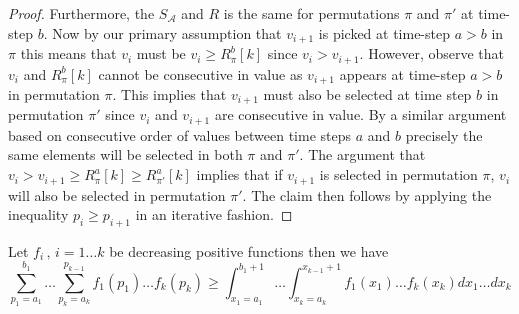 \begin{proof}
    
    Furthermore, the $S_{\mathcal{A}}$ and $R$ is the same for permutations $\pi$ and $\pi'$ at time-step $b$. Now by our primary assumption that $v_{i+1}$ is picked at time-step $a>b$ in $\pi$ this means that $v_i$ must be  $v_i \geq R^b_{\pi}[k]$ since $v_i > v_{i+1}$. However, observe that $v_i$ and $R^b_{\pi}[k]$ cannot be consecutive in value as $v_{i+1}$ appears at time-step $a > b$ in permutation $\pi$. This implies that $v_{i+1}$ must also be selected at time step $b$ in permutation $\pi'$ since $v_i$ and $v_{i+1}$ are consecutive in value. By a similar argument based on consecutive order of values between time steps $a$ and $b$ precisely the same elements will be selected in both $\pi$ and $\pi'$. The argument that   $v_{i} > v_{i+1} \geq R^a_{\pi}[k] \geq R^a_{\pi'}[k]$ implies that if $v_{i+1}$ is selected in permutation $\pi$, $v_i$ will also be selected in permutation $\pi'$. The claim then follows by applying the inequality $p_i \geq p_{i+1}$ in an iterative fashion.
\end{proof}
\begin{lemma} 
\label{lemma_three}
Let $f_i \,, \,i = 1 \ldots k$ be decreasing positive functions then we have 
\begin{equation}
    \sum_{p_1=a_1}^{b_1} \ldots \sum_{p_k=a_k}^{p_{k-1}} f_1(p_1) \ldots f_k(p_k)
    \geq \int_{x_1=a_1}^{b_1+1} \ldots \int_{x_k = a_k}^{x_{k-1}+1}  f_1(x_1) \ldots f_k(x_k) dx_1\dots dx_k
\end{equation}
\end{lemma}
